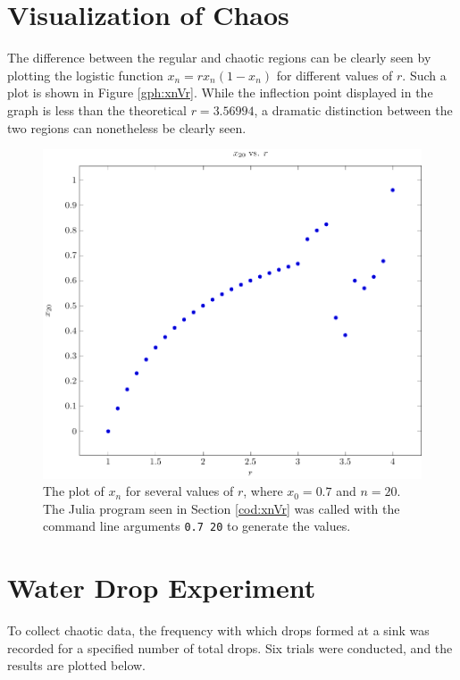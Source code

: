 \documentclass[a4paper]{article}
\begin{document}
\section{Visualization of Chaos}

\qq The difference between the regular and chaotic regions can be clearly seen
by plotting the logistic function \( x_n = r x_n (1 - x_n) \) for different
values of \( r \). Such a plot is shown in Figure \ref{gph:xnVr}. While the
inflection point displayed in the graph is less than the theoretical \( r =
3.56994 \), a dramatic distinction between the two regions can nonetheless be
clearly seen.

\begin{figure}[H]
  \begin{center}
    \includegraphics[width=1.0\textwidth]{Plots/PartE/xnVr.pdf}
  \end{center}
  \caption{The plot of \( x_n \) for several values of \( r \), where \( x_0 =
    0.7 \) and \( n = 20 \). The Julia program seen in Section \ref{cod:xnVr}
    was called with the command line arguments {\tt 0.7 20} to generate the
    values.}
\end{figure}

\section{Water Drop Experiment}

\qq To collect chaotic data, the frequency with which drops formed at a sink was
recorded for a specified number of total drops. Six trials were conducted, and the
results are plotted below.
\end{document}
